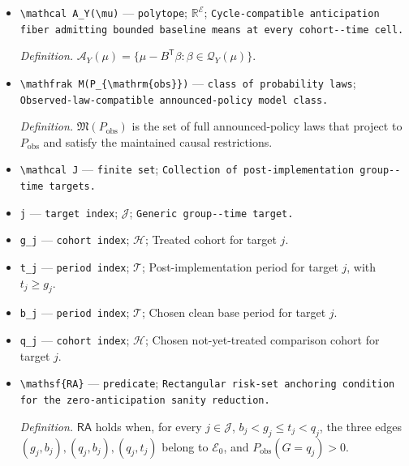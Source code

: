 \documentclass{article}
\begin{document}
\begin{itemize}
  \par\smallskip\noindent\emph{Definition.} \(\mathcal Q_Y(\mu)=\{\beta:d^-\le (B^+)^{\mathsf T}\beta\le d^+\}\).
  \item \texttt{\textbackslash{}\allowbreak{}mathcal A\_\allowbreak{}Y(\textbackslash{}\allowbreak{}mu)} --- \texttt{polytope}; \(\mathbb R^{\mathcal E}\); \texttt{Cycle-\allowbreak{}compatible anticipation fiber admitting bounded baseline means at every cohort-\allowbreak{}-\allowbreak{}time cell.}
  \par\smallskip\noindent\emph{Definition.} \(\mathcal A_Y(\mu)=\{\mu-B^{\mathsf T}\beta:\beta\in\mathcal Q_Y(\mu)\}\).
  \item \texttt{\textbackslash{}\allowbreak{}mathfrak M(P\_\allowbreak{}\{\textbackslash{}\allowbreak{}mathrm\{obs\}\allowbreak{}\}\allowbreak{})} --- \texttt{class of probability laws}; \texttt{Observed-\allowbreak{}law-\allowbreak{}compatible announced-\allowbreak{}policy model class.}
  \par\smallskip\noindent\emph{Definition.} \(\mathfrak M(P_{\mathrm{obs}})\) is the set of full announced-policy laws that project to \(P_{\mathrm{obs}}\) and satisfy the maintained causal restrictions.
  \item \texttt{\textbackslash{}\allowbreak{}mathcal J} --- \texttt{finite set}; \texttt{Collection of post-\allowbreak{}implementation group-\allowbreak{}-\allowbreak{}time targets.}
  \item \texttt{j} --- \texttt{target index}; \(\mathcal J\); \texttt{Generic group-\allowbreak{}-\allowbreak{}time target.}
  \item \texttt{g\_\allowbreak{}j} --- \texttt{cohort index}; \(\mathcal H\); Treated cohort for target \(j\).
  \item \texttt{t\_\allowbreak{}j} --- \texttt{period index}; \(\mathcal T\); Post-implementation period for target \(j\), with \(t_j\ge g_j\).
  \item \texttt{b\_\allowbreak{}j} --- \texttt{period index}; \(\mathcal T\); Chosen clean base period for target \(j\).
  \item \texttt{q\_\allowbreak{}j} --- \texttt{cohort index}; \(\mathcal H\); Chosen not-yet-treated comparison cohort for target \(j\).
  \item \texttt{\textbackslash{}\allowbreak{}mathsf\{RA\}\allowbreak{}} --- \texttt{predicate}; \texttt{Rectangular risk-\allowbreak{}set anchoring condition for the zero-\allowbreak{}anticipation sanity reduction.}
  \par\smallskip\noindent\emph{Definition.} \(\mathsf{RA}\) holds when, for every \(j\in\mathcal J\), \(b_j<g_j\le t_j<q_j\), the three edges \((g_j,b_j),(q_j,b_j),(q_j,t_j)\) belong to \(\mathcal E_0\), and \(P_{\mathrm{obs}}(G=q_j)>0\).

\end{itemize}
\end{document}
